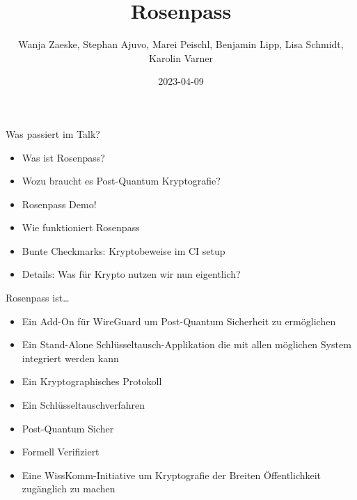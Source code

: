 \documentclass{rosenpass-beamer}
\title{Rosenpass}
\author{Wanja Zaeske, Stephan Ajuvo, Marei Peischl, Benjamin Lipp, Lisa Schmidt, Karolin Varner}
\institute{\url{https://rosenpass.eu}}
\date{2023-04-09}
\begin{document}
\maketitle

\begin{frame}{Was passiert im Talk?}
\begin{itemize}
  \item Was ist Rosenpass?
  \item Wozu braucht es Post-Quantum Kryptografie?
  \item Rosenpass Demo!
  \item Wie funktioniert Rosenpass
  \item Bunte Checkmarks: Kryptobeweise im CI setup
  \item Details: Was für Krypto nutzen wir nun eigentlich?
\end{itemize}
\end{frame}

\begin{frame}{Rosenpass ist…}
\begin{itemize}
  \item Ein Add-On für WireGuard um Post-Quantum Sicherheit zu ermöglichen
  \item Ein Stand-Alone Schlüsseltausch-Applikation die mit allen möglichen System integriert werden kann
\end{itemize}
\begin{itemize}
  \item Ein Kryptographisches Protokoll
  \item Ein Schlüsseltauschverfahren
  \item Post-Quantum Sicher
  \item Formell Verifiziert
\end{itemize}
\begin{itemize}
  \item Eine WissKomm-Initiative um Kryptografie der Breiten Öffentlichkeit zugänglich zu machen
\end{itemize}
\end{frame}

\end{document}
